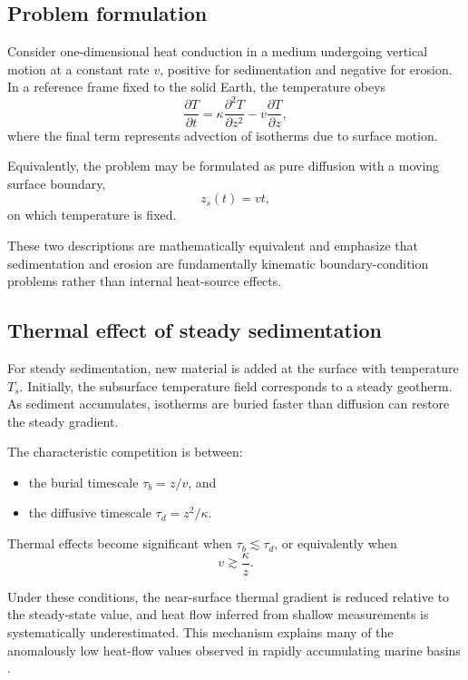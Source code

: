 \subsection{Problem formulation}

Consider one-dimensional heat conduction in a medium undergoing vertical motion at a constant rate $v$, positive for sedimentation and negative for erosion. In a reference frame fixed to the solid Earth, the temperature obeys
\begin{equation}
\frac{\partial T}{\partial t}
=
\kappa \frac{\partial^2 T}{\partial z^2}
-
v \frac{\partial T}{\partial z},
\end{equation}
where the final term represents advection of isotherms due to surface motion.

Equivalently, the problem may be formulated as pure diffusion with a moving surface boundary,
\begin{equation}
z_s(t) = v t,
\end{equation}
on which temperature is fixed.

These two descriptions are mathematically equivalent and emphasize that sedimentation and erosion are fundamentally kinematic boundary-condition problems rather than internal heat-source effects.

\subsection{Thermal effect of steady sedimentation}

For steady sedimentation, new material is added at the surface with temperature $T_s$. Initially, the subsurface temperature field corresponds to a steady geotherm.  As sediment accumulates, isotherms are buried faster than diffusion can restore the steady gradient.

The characteristic competition is between:
\begin{itemize}
\item the burial timescale $\tau_b = z / v$, and
\item the diffusive timescale $\tau_d = z^2 / \kappa$.
\end{itemize}

Thermal effects become significant when $\tau_b \lesssim \tau_d$, or equivalently when
\begin{equation}
v \gtrsim \frac{\kappa}{z}.
\end{equation}

Under these conditions, the near-surface thermal gradient is reduced relative to the steady-state value, and heat flow inferred from shallow measurements is systematically underestimated. This mechanism explains many of the anomalously low heat-flow values observed in rapidly accumulating marine basins \citep{VonHerzen&Uyeda1963}.

